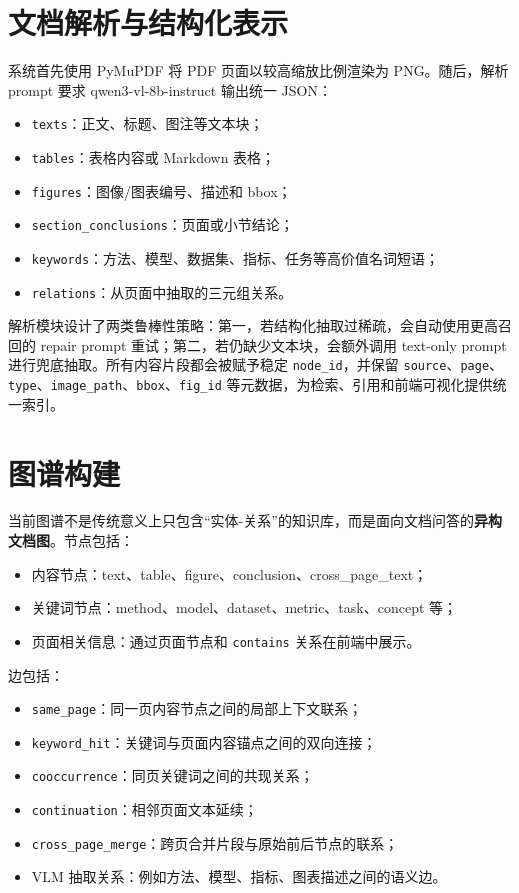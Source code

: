 \section{文档解析与结构化表示}\label{ux6587ux6863ux89e3ux6790ux4e0eux7ed3ux6784ux5316ux8868ux793a}

系统首先使用 PyMuPDF 将 PDF 页面以较高缩放比例渲染为 PNG。随后，解析
prompt 要求 qwen3-vl-8b-instruct 输出统一 JSON：

\begin{itemize}
\tightlist
\item
  \texttt{texts}：正文、标题、图注等文本块；
\item
  \texttt{tables}：表格内容或 Markdown 表格；
\item
  \texttt{figures}：图像/图表编号、描述和 bbox；
\item
  \texttt{section\_conclusions}：页面或小节结论；
\item
  \texttt{keywords}：方法、模型、数据集、指标、任务等高价值名词短语；
\item
  \texttt{relations}：从页面中抽取的三元组关系。
\end{itemize}

解析模块设计了两类鲁棒性策略：第一，若结构化抽取过稀疏，会自动使用更高召回的
repair prompt 重试；第二，若仍缺少文本块，会额外调用 text-only prompt
进行兜底抽取。所有内容片段都会被赋予稳定 \texttt{node\_id}，并保留
\texttt{source}、\texttt{page}、\texttt{type}、\texttt{image\_path}、\texttt{bbox}、\texttt{fig\_id}
等元数据，为检索、引用和前端可视化提供统一索引。

\section{图谱构建}\label{ux56feux8c31ux6784ux5efa}

当前图谱不是传统意义上只包含``实体-关系''的知识库，而是面向文档问答的\textbf{异构文档图}。节点包括：

\begin{itemize}
\tightlist
\item
  内容节点：text、table、figure、conclusion、cross\_page\_text；
\item
  关键词节点：method、model、dataset、metric、task、concept 等；
\item
  页面相关信息：通过页面节点和 \texttt{contains} 关系在前端中展示。
\end{itemize}

边包括：

\begin{itemize}
\tightlist
\item
  \texttt{same\_page}：同一页内容节点之间的局部上下文联系；
\item
  \texttt{keyword\_hit}：关键词与页面内容锚点之间的双向连接；
\item
  \texttt{cooccurrence}：同页关键词之间的共现关系；
\item
  \texttt{continuation}：相邻页面文本延续；
\item
  \texttt{cross\_page\_merge}：跨页合并片段与原始前后节点的联系；
\item
  VLM 抽取关系：例如方法、模型、指标、图表描述之间的语义边。
\end{itemize}

